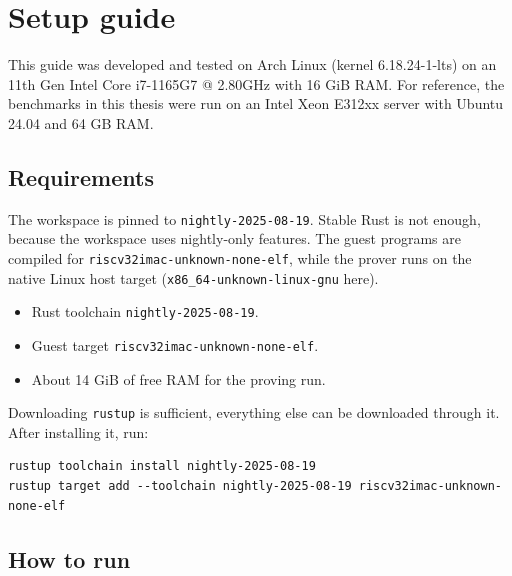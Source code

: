 \thispagestyle{empty}
\renewcommand*{\thepage}{C-\arabic{page}}

\chapter{Setup guide}

This guide was developed and tested on Arch Linux (kernel 6.18.24-1-lts) on an
11th Gen Intel Core i7-1165G7 @ 2.80GHz with 16 GiB RAM. For reference, the
benchmarks in this thesis were run on an Intel Xeon E312xx server with Ubuntu
24.04 and 64 GB RAM.

\section{Requirements}

The workspace is pinned to \texttt{nightly-2025-08-19}. Stable Rust is not
enough, because the workspace uses nightly-only features. The guest programs are
compiled for \texttt{riscv32imac-unknown-none-elf}, while the prover runs on the
native Linux host target (\texttt{x86\_64-unknown-linux-gnu} here).

\begin{itemize}
	\item Rust toolchain \texttt{nightly-2025-08-19}.
	\item Guest target \texttt{riscv32imac-unknown-none-elf}.
	\item About 14 GiB of free RAM for the proving run.
\end{itemize}

Downloading \texttt{rustup} is sufficient, everything else can be downloaded through it.
After installing it, run:

\begin{verbatim}
rustup toolchain install nightly-2025-08-19
rustup target add --toolchain nightly-2025-08-19 riscv32imac-unknown-none-elf
\end{verbatim}

\section{How to run}


